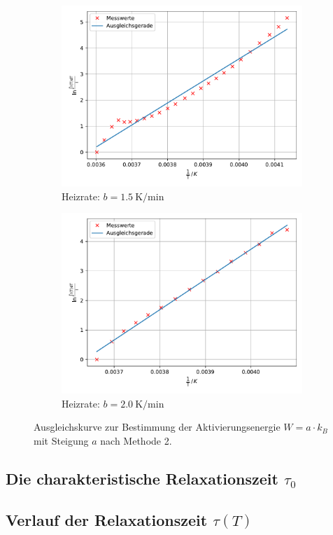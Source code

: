 \begin{figure}
    \begin{subfigure}{0.48\textwidth}
        \centering
        \includegraphics[height=0.8\textwidth]{content/data/integration_15.pdf}
        \caption{Heizrate: $b = \SI{1.5}{\kelvin \per \minute}$}
        \label{subfig:int_15}
    \end{subfigure}
    \hfill
    \begin{subfigure}{0.48\textwidth}
        \centering
        \includegraphics[height=0.8\textwidth]{content/data/integration_20.pdf}
        \caption{Heizrate: $b = \SI{2.0}{\kelvin \per \minute}$}
        \label{subfig:int_20}
    \end{subfigure}
    \caption{Ausgleichskurve zur Bestimmung der Aktivierungsenergie $W = a \cdot k_B$ mit Steigung $a$ nach Methode 2.\cite{matplotlib}\cite{scipy}\cite{numpy}}
    \label{fig:int}
\end{figure}
\FloatBarrier

\subsection{Die charakteristische Relaxationszeit \texorpdfstring{$\tau_0$}{TEXT}}

\subsection{Verlauf der Relaxationszeit \texorpdfstring{$\tau (T)$}{TEXT}}